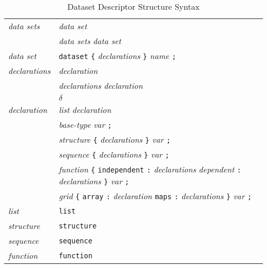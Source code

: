 \begin{table}
\caption{Dataset Descriptor Structure Syntax}
\label{tab:DDS}
\small
\begin{center}
\begin{tabular}{ll} \hline
%
%
{\em data sets\/} & {\em data set\/} \\
                 & {\em data sets} {\em data set\/} \\

{\em data set\/}  & {\tt dataset} {\tt \{} {\em declarations\/} {\tt \}} 
                   {\em  name\/} {\tt ;} \\

{\em declarations\/} & {\em declaration\/} \\
                 & {\em declarations} {\em  declaration\/} \\
                 &  $\delta$ \\

{\em declaration\/} &   {\em list} {\em declaration\/}  \\
                 & {\em base-type} {\em var\/} {\tt ;} \\
                 & {\em structure\/}  {\tt \{} {\em declarations\/} {\tt \}} 
                  {\em var\/} {\tt ;} \\
                 & {\em sequence\/} {\tt \{} {\em declarations\/} {\tt \}} 
                  {\em var\/} {\tt ;} \\
                 & {\em function\/} {\tt \{} {\tt independent} {\tt :}
                  {\em declarations} {\em dependent\/} {\tt :} 
                  {\em declarations\/} {\tt \}} 
                  {\em var\/} {\tt ;} \\
                 & {\em grid\/} {\tt \{} {\tt array} {\tt :} 
                  {\em declaration\/} {\tt maps} {\tt :} 
                  {\em declarations\/} {\tt \}} 
                  {\em var\/} {\tt ;} \\

{\em list\/}    & {\tt list} \\

{\em structure\/} & {\tt structure} \\

{\em sequence\/} & {\tt sequence} \\

{\em function\/} & {\tt function} \\


\end{tabular}
\end{center}
\end{table}
